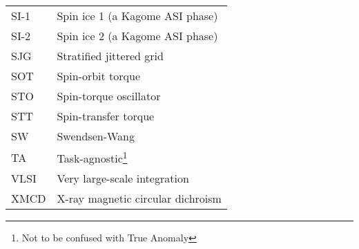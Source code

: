 {\begin{longtable}[l]{ll}
        SI-1  & Spin ice 1 (a Kagome ASI phase)             \\
        SI-2  & Spin ice 2 (a Kagome ASI phase)             \\
        SJG   & Stratified jittered grid                    \\
        SOT   & Spin-orbit torque                           \\
        STO   & Spin-torque oscillator                      \\
        STT   & Spin-transfer torque                        \\
        SW    & Swendsen-Wang                               \\ %
        TA    & Task-agnostic\footnote{Not to be confused with True Anomaly} \\
        VLSI  & Very large-scale integration                \\
        XMCD  & X-ray magnetic circular dichroism           \\
    \end{longtable}
}
